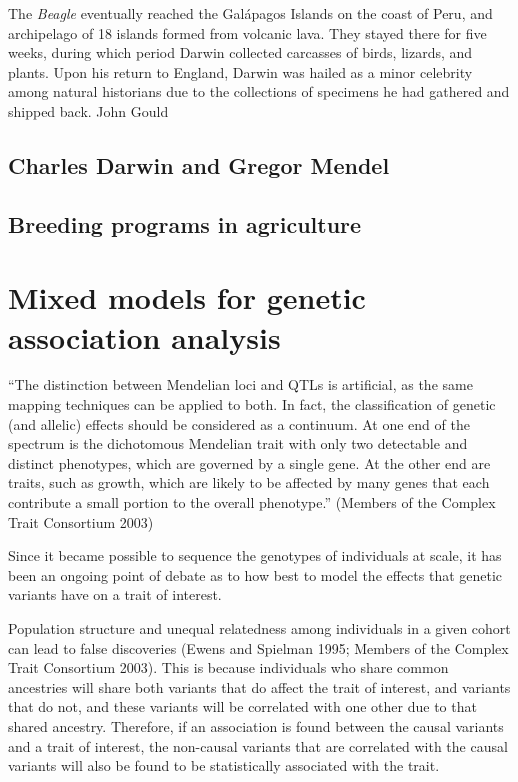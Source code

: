 \documentclass[
]{book}
\begin{document}
The \emph{Beagle} eventually reached the Galápagos Islands on the coast of Peru, and archipelago of 18 islands formed from volcanic lava. They stayed there for five weeks, during which period Darwin collected carcasses of birds, lizards, and plants. Upon his return to England, Darwin was hailed as a minor celebrity among natural historians due to the collections of specimens he had gathered and shipped back. John Gould

\hypertarget{charles-darwin-and-gregor-mendel}{%
\subsection{Charles Darwin and Gregor Mendel}\label{charles-darwin-and-gregor-mendel}}

\hypertarget{breeding-programs-in-agriculture}{%
\subsection{Breeding programs in agriculture}\label{breeding-programs-in-agriculture}}

\hypertarget{mixed-models-for-genetic-association-analysis}{%
\section{Mixed models for genetic association analysis}\label{mixed-models-for-genetic-association-analysis}}

``The distinction between Mendelian loci and QTLs is artificial, as the same mapping techniques can be applied to both. In fact, the classification of genetic (and allelic) effects should be considered as a continuum. At one end of the spectrum is the dichotomous Mendelian trait with only two detectable and distinct phenotypes, which are governed by a single gene. At the other end are traits, such as growth, which are likely to be affected by many genes that each contribute a small portion to the overall phenotype.'' (Members of the Complex Trait Consortium 2003)

Since it became possible to sequence the genotypes of individuals at scale, it has been an ongoing point of debate as to how best to model the effects that genetic variants have on a trait of interest.

Population structure and unequal relatedness among individuals in a given cohort can lead to false discoveries (Ewens and Spielman 1995; Members of the Complex Trait Consortium 2003). This is because individuals who share common ancestries will share both variants that do affect the trait of interest, and variants that do not, and these variants will be correlated with one other due to that shared ancestry. Therefore, if an association is found between the causal variants and a trait of interest, the non-causal variants that are correlated with the causal variants will also be found to be statistically associated with the trait.
\end{document}
